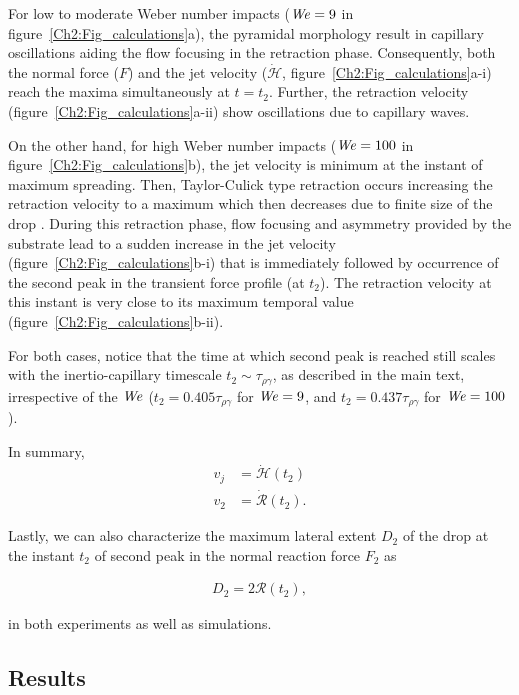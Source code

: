 \begin{subappendices}
	For low to moderate Weber number impacts ($\mathit{We} = 9$ in figure~\ref{Ch2:Fig_calculations}a), the pyramidal morphology result in capillary oscillations aiding the flow focusing in the retraction phase. Consequently, both the normal force ($F$) and the jet velocity ($\dot{\mathcal{H}}$, figure~\ref{Ch2:Fig_calculations}a-i) reach the maxima simultaneously at $t = t_2$. Further, the retraction velocity (figure~\ref{Ch2:Fig_calculations}a-ii) show oscillations due to capillary waves.
	
	On the other hand, for high Weber number impacts ($\mathit{We} = 100$ in figure~\ref{Ch2:Fig_calculations}b), the jet velocity is minimum at the instant of maximum spreading. Then, Taylor-Culick type retraction occurs increasing the retraction velocity to a maximum which then decreases due to finite size of the drop \cite{bartolo2005retraction, eggers2010drop, pierson2020revisiting, deka2020revisiting}.  During this retraction phase, flow focusing and asymmetry provided by the substrate lead to a sudden increase in the jet velocity (figure~\ref{Ch2:Fig_calculations}b-i) that is immediately followed by occurrence of the second peak in the transient force profile (at $t_2$). The retraction velocity at this instant is very close to its maximum temporal value (figure~\ref{Ch2:Fig_calculations}b-ii). 
	
	For both cases, notice that the time at which second peak is reached still scales with the inertio-capillary timescale $t_2 \sim \tau_{\rho\gamma}$, as described in the main text, irrespective of the $\mathit{We}$ ($t_2 = 0.405\tau_{\rho\gamma}$ for $\mathit{We} = 9$, and $t_2 = 0.437\tau_{\rho\gamma}$ for $\mathit{We} = 100$).
	
	In summary, 
	\begin{align}
		v_j &= \dot{\mathcal{H}}(t_2)\\
		v_2 &=  \dot{\mathcal{R}}(t_2).
	\end{align}
	
	Lastly, we can also characterize the maximum lateral extent $D_2$ of the drop at the instant $t_2$ of second peak in the normal reaction force $F_2$ as
	
	\begin{align}
			D_2 = 2\mathcal{R}\left(t_2\right),
	\end{align}
	
	\noindent in both experiments as well as simulations.
	
	\subsection{Results}
	\label{sec::calculations results}
	

\end{subappendices}
